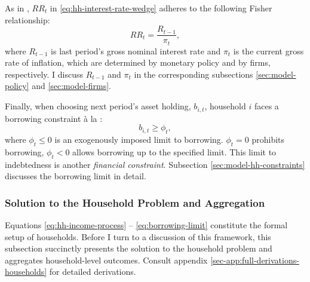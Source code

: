 \documentclass[a4paper,12pt]{article} %
\numberwithin{equation}{section} %
\numberwithin{figure}{section}
\numberwithin{table}{section}
\begin{document}
As in \textcite{auclert2021}, $RR_t$ in \eqref{eq:hh-interest-rate-wedge} adheres to the following Fisher relationship:
\begin{equation}
    RR_t = \frac{R_{t-1}}{\pi_t}, \label{eq:hh-fisher-equation}
\end{equation}
where $R_{t-1}$ is last period's gross nominal interest rate and $\pi_t$ is the current gross rate of inflation, which are determined by monetary policy and by firms, respectively. I discuss $R_{t-1}$ and $\pi_t$ in the corresponding subsections \ref{sec:model-policy} and \ref{sec:model-firms}.

Finally, when choosing next period's asset holding, $b_{i,t}$, household $i$ faces a borrowing constraint à la \textcite{huggett1993}:
\begin{equation}
    b_{i,t} \ge \phi_t, \label{eq:borrowing-limit}
\end{equation}
where $\phi_t \le 0$ is an exogenously imposed limit to borrowing. $\phi_t = 0$ prohibits borrowing, $\phi_t < 0$ allows borrowing up to the specified limit. This limit to indebtedness is another \textit{financial constraint}. Subsection \ref{sec:model-hh-constraints} discusses the borrowing limit in detail.

\subsubsection{Solution to the Household Problem and Aggregation}
\label{sec:model-hh-solution}

Equations \eqref{eq:hh-income-process} -- \eqref{eq:borrowing-limit} constitute the formal setup of households. Before I turn to a discussion of this framework, this subsection succinctly presents the solution to the household problem and aggregates household-level outcomes. Consult appendix \ref{sec-app:full-derivations-households} for detailed derivations.
\end{document}
